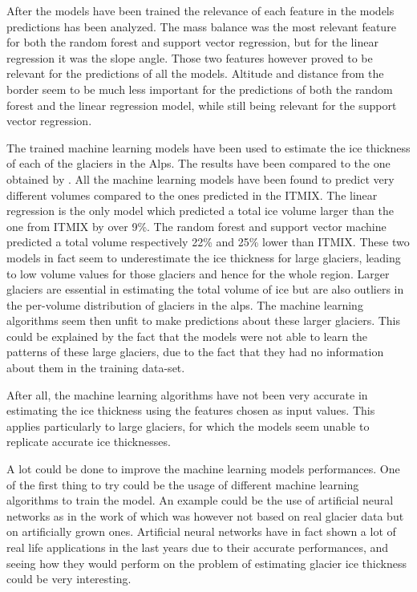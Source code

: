 After the models have been trained the relevance of each feature in the models predictions has been analyzed. The mass balance was the most relevant feature for both the random forest and support vector regression, but for the linear regression it was the slope angle. Those two features however proved to be relevant for the predictions of all the models. Altitude and distance from the border seem to be much less important for the predictions of both the random forest and the linear regression model, while still being relevant for the support vector regression.

The trained machine learning models have been used to estimate the ice thickness of each of the glaciers in the Alps. The results have been compared to the one obtained by \citet{Farinotti2019}. All the machine learning models have been found to predict very different volumes compared to the ones predicted in the ITMIX. The linear regression is the only model which predicted a total ice volume larger than the one from ITMIX by over 9\%. The random forest and support vector machine predicted a total volume respectively 22\% and 25\% lower than ITMIX. These two models in fact seem to underestimate the ice thickness for large glaciers, leading to low volume values for those glaciers and hence for the whole region. Larger glaciers are essential in estimating the total volume of ice but are also outliers in the per-volume distribution of glaciers in the alps. The machine learning algorithms seem then unfit to make predictions about these larger glaciers. This could be explained by the fact that the models were not able to learn the patterns of these large glaciers, due to the fact that they had no information about them in the training data-set. 

After all, the machine learning algorithms have not been very accurate in estimating the ice thickness using the features chosen as input values. This applies particularly to large glaciers, for which the models seem unable to replicate accurate ice thicknesses.

A lot could be done to improve the machine learning models performances. 
One of the first thing to try could be the usage of different machine learning algorithms to train the model. An example could be the use of artificial neural networks as in the work of \citet{Clarke2009} which was however not based on real glacier data but on artificially grown ones. Artificial neural networks have in fact shown a lot of real life applications in the last years due to their accurate performances, and seeing how they would perform on the problem of estimating glacier ice thickness could be very interesting.
  
